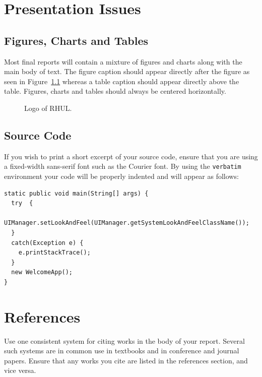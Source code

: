 \documentclass[]{final_report}
\begin{document}
\chapter{Presentation Issues}

\section{Figures, Charts and Tables}

Most final reports will contain a mixture of figures and charts along with the main body of text. The figure caption should appear directly after the figure as seen in Figure~\ref{fig:logo} whereas a table caption should appear directly above the table. Figures, charts and tables should always be centered horizontally. 

\begin{figure}[h]
\centering
\fboxsep 2mm
\caption{\label{fig:logo} Logo of RHUL.}
\end{figure} 

\section{Source Code}

If you wish to print a short excerpt of your source code,  ensure that you are using a fixed-width sans-serif font such as the Courier font. By using the \verb|verbatim| environment your code will be properly indented and will appear as follows:

\begin{verbatim}
static public void main(String[] args) {
  try  {
    UIManager.setLookAndFeel(UIManager.getSystemLookAndFeelClassName());
  }
  catch(Exception e) {
    e.printStackTrace();
  }
  new WelcomeApp();
} 
\end{verbatim}

\chapter{References}

Use one consistent system for citing works in the body of your report. Several such systems are in common use in textbooks and in conference and journal papers. Ensure that any works you cite are listed in the references section, and vice versa. 
\end{document}
